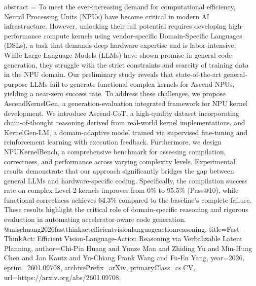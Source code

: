{      abstract = {To meet the ever-increasing demand for computational efficiency, Neural Processing Units (NPUs) have become critical in modern AI infrastructure. However, unlocking their full potential requires developing high-performance compute kernels using vendor-specific Domain-Specific Languages (DSLs), a task that demands deep hardware expertise and is labor-intensive. While Large Language Models (LLMs) have shown promise in general code generation, they struggle with the strict constraints and scarcity of training data in the NPU domain. Our preliminary study reveals that state-of-the-art general-purpose LLMs fail to generate functional complex kernels for Ascend NPUs, yielding a near-zero success rate. To address these challenges, we propose AscendKernelGen, a generation-evaluation integrated framework for NPU kernel development. We introduce Ascend-CoT, a high-quality dataset incorporating chain-of-thought reasoning derived from real-world kernel implementations, and KernelGen-LM, a domain-adaptive model trained via supervised fine-tuning and reinforcement learning with execution feedback. Furthermore, we design NPUKernelBench, a comprehensive benchmark for assessing compilation, correctness, and performance across varying complexity levels. Experimental results demonstrate that our approach significantly bridges the gap between general LLMs and hardware-specific coding. Specifically, the compilation success rate on complex Level-2 kernels improves from 0\% to 95.5\% (Pass@10), while functional correctness achieves 64.3\% compared to the baseline's complete failure. These results highlight the critical role of domain-specific reasoning and rigorous evaluation in automating accelerator-aware code generation.}
}@misc{huang2026fastthinkactefficientvisionlanguageactionreasoning,
      title={Fast-ThinkAct: Efficient Vision-Language-Action Reasoning via Verbalizable Latent Planning}, 
      author={Chi-Pin Huang and Yunze Man and Zhiding Yu and Min-Hung Chen and Jan Kautz and Yu-Chiang Frank Wang and Fu-En Yang},
      year={2026},
      eprint={2601.09708},
      archivePrefix={arXiv},
      primaryClass={cs.CV},
      url={https://arxiv.org/abs/2601.09708},
}

